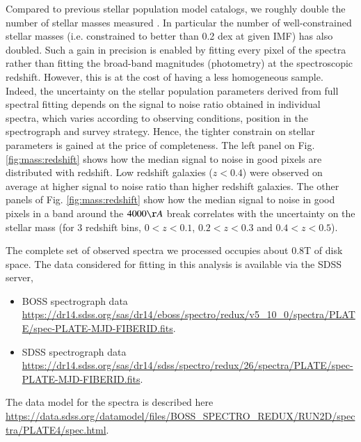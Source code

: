 \documentclass[onecolumn]{aa}
\begin{document}
Compared to previous stellar population model catalogs, we roughly double the number of stellar masses measured \citep[DR12][]{Maraston2013,Thomas2013a}. %
In particular the number of well-constrained stellar masses (i.e. constrained to better than 0.2 dex at given IMF) has also doubled. 
Such a gain in precision is enabled by fitting every pixel of the spectra rather than fitting the broad-band magnitudes (photometry) at the spectroscopic redshift. 
However, this is at the cost of having a less homogeneous sample. 
Indeed, the uncertainty on the stellar population parameters derived from full spectral fitting depends on the signal to noise ratio obtained in individual spectra, which varies according to observing conditions, position in the spectrograph and survey strategy. 
Hence, the tighter constrain on stellar parameters is gained at the price of completeness. 
The left panel on Fig. \ref{fig:mass:redshift} shows how the median signal to noise in good pixels are distributed with redshift. 
Low redshift galaxies ($z<0.4$) were observed on average at higher signal to noise ratio than higher redshift galaxies.
The other panels of Fig. \ref{fig:mass:redshift} show how the median signal to noise in good pixels in a band around the $4000\AA$ break correlates with the uncertainty on the stellar mass (for 3 redshift bins, $0<z<0.1$, $0.2<z<0.3$ and $0.4<z<0.5$).  

The complete set of observed spectra we processed occupies about 0.8T of disk space.
The data considered for fitting in this analysis is available via the SDSS server,
\begin{itemize}
\item BOSS spectrograph data\\ \url{https://dr14.sdss.org/sas/dr14/eboss/spectro/redux/v5_10_0/spectra/PLATE/spec-PLATE-MJD-FIBERID.fits}. 
\item SDSS spectrograph data\\ \url{https://dr14.sdss.org/sas/dr14/sdss/spectro/redux/26/spectra/PLATE/spec-PLATE-MJD-FIBERID.fits}.
\end{itemize}
The data model for the spectra is described here \url{https://data.sdss.org/datamodel/files/BOSS_SPECTRO_REDUX/RUN2D/spectra/PLATE4/spec.html}. 
\end{document}

